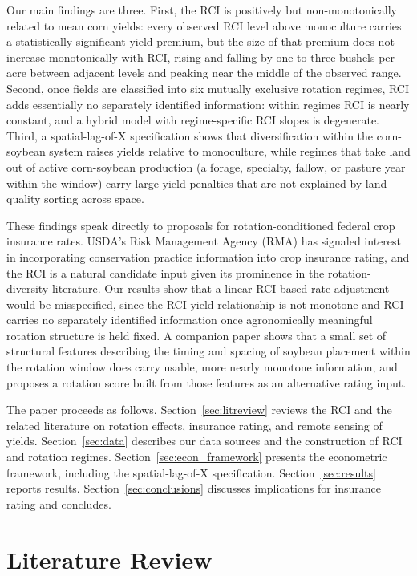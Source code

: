 \documentclass[12pt,letterpaper]{article}
\theoremstyle{remark}
\theoremstyle{remark}
\theoremstyle{plain}
\theoremstyle{definition}
\begin{document}
Our main findings are three. First, the RCI is positively but non-monotonically related to mean corn yields: every observed RCI level above monoculture carries a statistically significant yield premium, but the size of that premium does not increase monotonically with RCI, rising and falling by one to three bushels per acre between adjacent levels and peaking near the middle of the observed range. Second, once fields are classified into six mutually exclusive rotation regimes, RCI adds essentially no separately identified information: within regimes RCI is nearly constant, and a hybrid model with regime-specific RCI slopes is degenerate. Third, a spatial-lag-of-X specification shows that diversification within the corn-soybean system raises yields relative to monoculture, while regimes that take land out of active corn-soybean production (a forage, specialty, fallow, or pasture year within the window) carry large yield penalties that are not explained by land-quality sorting across space.

These findings speak directly to proposals for rotation-conditioned federal crop insurance rates. USDA's Risk Management Agency (RMA) has signaled interest in incorporating conservation practice information into crop insurance rating, and the RCI is a natural candidate input given its prominence in the rotation-diversity literature. Our results show that a linear RCI-based rate adjustment would be misspecified, since the RCI-yield relationship is not monotone and RCI carries no separately identified information once agronomically meaningful rotation structure is held fixed. A companion paper shows that a small set of structural features describing the timing and spacing of soybean placement within the rotation window does carry usable, more nearly monotone information, and proposes a rotation score built from those features as an alternative rating input.

The paper proceeds as follows. Section~\ref{sec:litreview} reviews the RCI and the related literature on rotation effects, insurance rating, and remote sensing of yields. Section~\ref{sec:data} describes our data sources and the construction of RCI and rotation regimes. Section~\ref{sec:econ_framework} presents the econometric framework, including the spatial-lag-of-X specification. Section~\ref{sec:results} reports results. Section~\ref{sec:conclusions} discusses implications for insurance rating and concludes.

\section{\label{sec:litreview}Literature Review}
\end{document}
